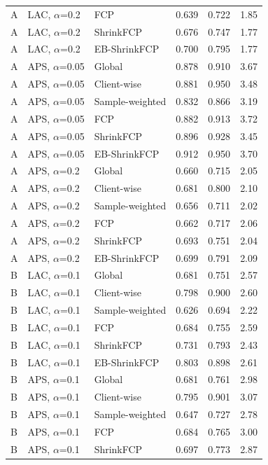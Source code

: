 \documentclass[10pt]{article}
\begin{document}
\begin{table}[!htbp]
\begin{tabular}{@{}lllrrr@{}}
A & LAC, $\alpha$=0.2 & FCP & 0.639 & 0.722 & 1.85 \\
A & LAC, $\alpha$=0.2 & ShrinkFCP & 0.676 & 0.747 & 1.77 \\
A & LAC, $\alpha$=0.2 & EB-ShrinkFCP & 0.700 & 0.795 & 1.77 \\
\midrule
A & APS, $\alpha$=0.05 & Global & 0.878 & 0.910 & 3.67 \\
A & APS, $\alpha$=0.05 & Client-wise & 0.881 & 0.950 & 3.48 \\
A & APS, $\alpha$=0.05 & Sample-weighted & 0.832 & 0.866 & 3.19 \\
A & APS, $\alpha$=0.05 & FCP & 0.882 & 0.913 & 3.72 \\
A & APS, $\alpha$=0.05 & ShrinkFCP & 0.896 & 0.928 & 3.45 \\
A & APS, $\alpha$=0.05 & EB-ShrinkFCP & 0.912 & 0.950 & 3.70 \\
\midrule
A & APS, $\alpha$=0.2 & Global & 0.660 & 0.715 & 2.05 \\
A & APS, $\alpha$=0.2 & Client-wise & 0.681 & 0.800 & 2.10 \\
A & APS, $\alpha$=0.2 & Sample-weighted & 0.656 & 0.711 & 2.02 \\
A & APS, $\alpha$=0.2 & FCP & 0.662 & 0.717 & 2.06 \\
A & APS, $\alpha$=0.2 & ShrinkFCP & 0.693 & 0.751 & 2.04 \\
A & APS, $\alpha$=0.2 & EB-ShrinkFCP & 0.699 & 0.791 & 2.09 \\
\midrule
B & LAC, $\alpha$=0.1 & Global & 0.681 & 0.751 & 2.57 \\
B & LAC, $\alpha$=0.1 & Client-wise & 0.798 & 0.900 & 2.60 \\
B & LAC, $\alpha$=0.1 & Sample-weighted & 0.626 & 0.694 & 2.22 \\
B & LAC, $\alpha$=0.1 & FCP & 0.684 & 0.755 & 2.59 \\
B & LAC, $\alpha$=0.1 & ShrinkFCP & 0.731 & 0.793 & 2.43 \\
B & LAC, $\alpha$=0.1 & EB-ShrinkFCP & 0.803 & 0.898 & 2.61 \\
\midrule
B & APS, $\alpha$=0.1 & Global & 0.681 & 0.761 & 2.98 \\
B & APS, $\alpha$=0.1 & Client-wise & 0.795 & 0.901 & 3.07 \\
B & APS, $\alpha$=0.1 & Sample-weighted & 0.647 & 0.727 & 2.78 \\
B & APS, $\alpha$=0.1 & FCP & 0.684 & 0.765 & 3.00 \\
B & APS, $\alpha$=0.1 & ShrinkFCP & 0.697 & 0.773 & 2.87 \\

\end{tabular}
\end{table}
\end{document}
